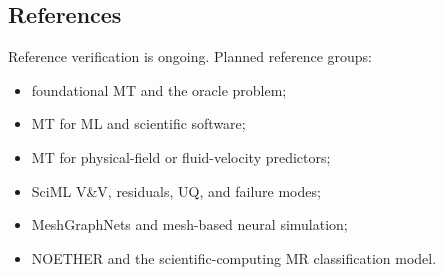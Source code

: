 \subsection{References}\label{references}

Reference verification is ongoing. Planned reference groups:

\begin{itemize}
\tightlist
\item
  foundational MT and the oracle problem;
\item
  MT for ML and scientific software;
\item
  MT for physical-field or fluid-velocity predictors;
\item
  SciML V\&V, residuals, UQ, and failure modes;
\item
  MeshGraphNets and mesh-based neural simulation;
\item
  NOETHER and the scientific-computing MR classification model.
\end{itemize}
